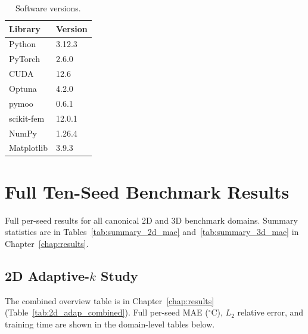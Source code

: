 \begin{table}[H]
\centering
\caption{Software versions.}
\label{tab:software}
\small
\begin{tabular}{ll}
\toprule
Library & Version \\
\midrule
Python & 3.12.3 \\ PyTorch & 2.6.0 \\ CUDA & 12.6 \\
Optuna & 4.2.0 \\ pymoo & 0.6.1 \\ scikit-fem & 12.0.1 \\
NumPy & 1.26.4 \\ Matplotlib & 3.9.3 \\
\bottomrule
\end{tabular}
\end{table}

\chapter{Full Ten-Seed Benchmark Results}
\label{app:full_results}

Full per-seed results for all canonical 2D and 3D benchmark domains.
Summary statistics are in Tables~\ref{tab:summary_2d_mae}
and~\ref{tab:summary_3d_mae} in Chapter~\ref{chap:results}.

\section*{2D Adaptive-$k$ Study}

The combined overview table is in Chapter~\ref{chap:results}
(Table~\ref{tab:2d_adap_combined}).
Full per-seed MAE ($^\circ\mathrm{C}$), $L_2$ relative error, and training
time are shown in the domain-level tables below.

